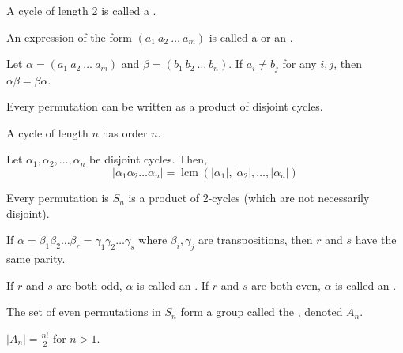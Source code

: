 \documentclass{mathnotes}
\DeclareMathOperator{\lcm}{lcm}
\begin{document}
\begin{defi}
  A cycle of length 2 is called a .
\end{defi}

\begin{defi}
  An expression of the form $(a_1\ a_2\ \ldots\ a_m)$ is called a  or an .
\end{defi}

\begin{prop}
  Let $\alpha=(a_1\ a_2\ \ldots\ a_m)$ and $\beta=(b_1\ b_2\ \ldots\ b_n)$. If
  $a_i\ne b_j$ for any $i,j$, then $\alpha\beta=\beta\alpha$.
\end{prop}

\begin{prop}
  Every permutation can be written as a product of disjoint cycles.
\end{prop}

\begin{prop}
  A cycle of length $n$ has order $n$.
\end{prop}

\begin{prop}
  Let $\alpha_1,\alpha_2,\ldots,\alpha_n$ be disjoint cycles. Then,
  $$|\alpha_1\alpha_2\ldots\alpha_n|=
  \lcm(|\alpha_1|,|\alpha_2|,\ldots,|\alpha_n|)$$
\end{prop}

\begin{prop}
  Every permutation is $S_n$ is a product of 2-cycles (which are not
  necessarily disjoint).
\end{prop}

\begin{prop}
  If $\alpha=\beta_1\beta_2\ldots\beta_r=\gamma_1\gamma_2\ldots\gamma_s$
  where $\beta_i,\gamma_j$ are transpositions, then $r$ and $s$ have the same
  parity.
\end{prop}

\begin{defi}
  If $r$ and $s$ are both odd, $\alpha$ is called an . If $r$ and $s$ are both even, $\alpha$ is called an
  .
\end{defi}

\begin{defi}
  The set of even permutations in $S_n$ form a group called the
  , denoted $A_n$.
\end{defi}

\begin{note}
  $|A_n|=\frac{n!}{2}$ for $n>1$.
\end{note}
\end{document}

